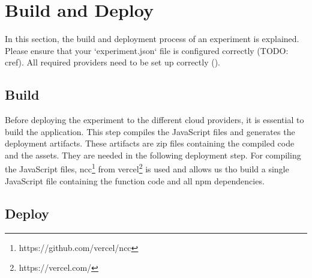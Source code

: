 \documentclass[../main.tex]{subfiles}
\begin{document}
\section{Build and Deploy}\label{sec:buildanddeploy}
In this section, the build and deployment process of an experiment is explained. Please ensure that your `experiment.json` file is configured correctly (TODO: cref). All required providers need to be set up correctly ().

\subsection{Build}\label{sec:build}
Before deploying the experiment to the different cloud providers, it is essential to build the application. This step compiles the JavaScript files and generates the deployment artifacts. These artifacts are zip files containing the compiled code and the assets. They are needed in the following deployment step. For compiling the JavaScript files, ncc\footnote{https://github.com/vercel/ncc} from vercel\footnote{https://vercel.com/} is used and allows us tho build a single JavaScript file containing the function code and all npm dependencies.

\subsection{Deploy}\label{sec:deploy}
\end{document}
